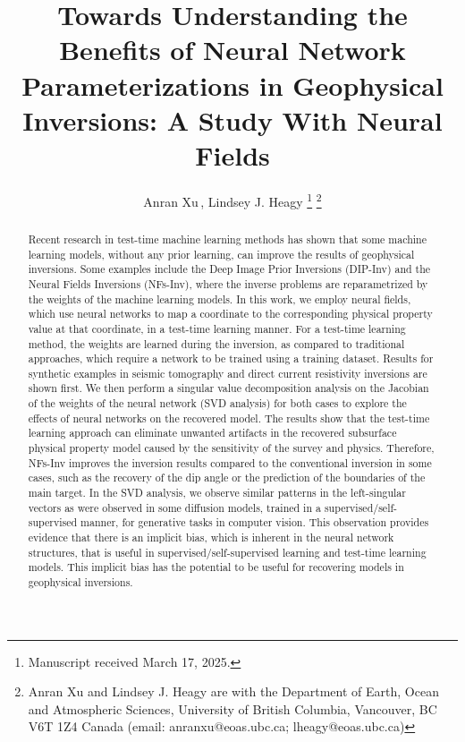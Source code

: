 \documentclass[lettersize,journal]{IEEEtran}
\begin{document}
\title{Towards Understanding the Benefits of Neural Network Parameterizations in Geophysical Inversions: A Study With Neural Fields}

\author{Anran Xu\,, Lindsey J. Heagy
\thanks{Manuscript received March 17, 2025.}%
\thanks{Anran Xu and Lindsey J. Heagy are with the Department of Earth, Ocean and Atmospheric Sciences, University of British Columbia, Vancouver, BC V6T 1Z4 Canada (email: anranxu@eoas.ubc.ca; lheagy@eoas.ubc.ca)}}

\maketitle

\begin{abstract}
Recent research in test-time machine learning methods has shown that some machine learning models, without any prior learning, can improve the results of geophysical inversions. Some examples include the Deep Image Prior Inversions (DIP-Inv) and the Neural Fields Inversions (NFs-Inv), where the inverse problems are reparametrized by the weights of the machine learning models. In this work, we employ neural fields, which use neural networks to map a coordinate to the corresponding physical property value at that coordinate, in a test-time learning manner. For a test-time learning method, the weights are learned during the inversion, as compared to traditional approaches, which require a network to be trained using a training dataset. Results for synthetic examples in seismic tomography and direct current resistivity inversions are shown first. We then perform a singular value decomposition analysis on the Jacobian of the weights of the neural network (SVD analysis) for both cases to explore the effects of neural networks on the recovered model. The results show that the test-time learning approach can eliminate unwanted artifacts in the recovered subsurface physical property model caused by the sensitivity of the survey and physics. Therefore, NFs-Inv improves the inversion results compared to the conventional inversion in some cases, such as the recovery of the dip angle or the prediction of the boundaries of the main target. In the SVD analysis, we observe similar patterns in the left-singular vectors as were observed in some diffusion models, trained in a supervised/self-supervised manner, for generative tasks in computer vision. This observation provides evidence that there is an implicit bias, which is inherent in the neural network structures, that is useful in supervised/self-supervised learning and test-time learning models. This implicit bias has the potential to be useful for recovering models in geophysical inversions.

\end{abstract}
\end{document}
